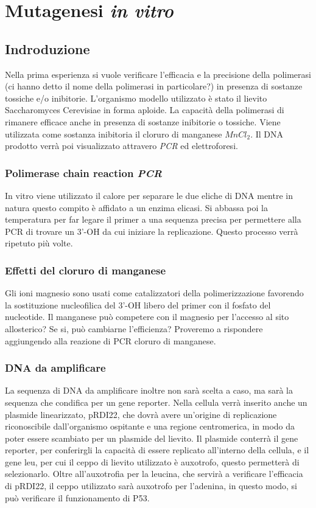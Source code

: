 \section*{Mutagenesi \emph{in vitro}}

	\subsection*{Indroduzione}
        Nella prima esperienza si vuole verificare l'efficacia e la precisione della polimerasi (ci hanno detto il nome della polimerasi in particolare?)
        in presenza di sostanze tossiche e/o inibitorie.
        L'organismo modello utilizzato è stato il lievito Saccharomyces Cerevisiae in forma aploide.
	La capacit\`a della polimerasi di rimanere efficace anche in presenza di sostanze inibitorie o tossiche.
	Viene utilizzata come sostanza inibitoria il cloruro di manganese \emph{$MnCl_2$}.
	Il DNA prodotto verr\`a poi visualizzato attravero \emph{PCR} ed elettroforesi.
        
		\subsubsection*{Polimerase chain reaction \emph{PCR}}
		In vitro viene utilizzato il calore per separare le due eliche di DNA mentre in natura questo compito è affidato a un enzima elicasi. 
       		 Si abbassa poi la temperatura per far legare il primer a una sequenza precisa per permettere alla PCR di trovare un 3'-OH da cui iniziare la replicazione.
        	Questo processo verrà ripetuto più volte.

		\subsubsection*{Effetti del cloruro di manganese}
        	Gli ioni magnesio sono usati come catalizzatori della polimerizzazione favorendo la sostituzione nucleofilica del 3'-OH libero del primer con il fosfato del nucleotide.
        	Il manganese può competere con il magnesio per l'accesso al sito allosterico? Se si, può cambiarne l'efficienza?
        	Proveremo a rispondere aggiungendo alla reazione di PCR cloruro di manganese.

		\subsubsection*{DNA da amplificare}
        	La sequenza di DNA da amplificare inoltre non sarà scelta a caso, ma sarà la sequenza che condifica per un gene reporter.
		Nella cellula verrà inserito anche un plasmide linearizzato, pRDI22, che dovrà avere un'origine di replicazione riconoscibile dall'organismo ospitante e una regione centromerica, in modo da poter essere scambiato per un plasmide del lievito.
        	Il plasmide conterrà il gene reporter, per conferirgli la capacità di essere replicato all'interno della cellula, e il gene leu, per cui il ceppo di lievito utilizzato è auxotrofo, questo permetterà di selezionarlo.
        	Oltre all'auxotrofia per la leucina, che servirà a verificare l'efficacia di pRDI22, il ceppo utilizzato sarà auxotrofo per l'adenina, in questo modo, si può verificare il funzionamento di P53.

